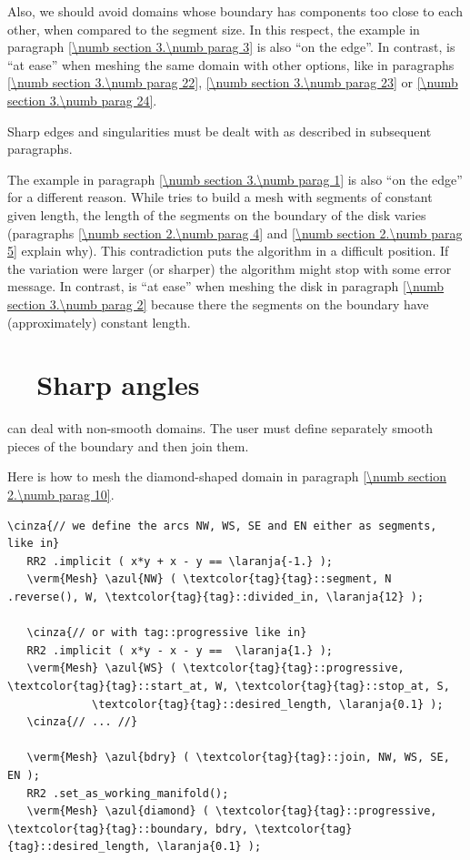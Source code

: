Also, we should avoid domains whose boundary has components too close to each other,
when compared to the segment size.
In this respect, the example in paragraph \ref{\numb section 3.\numb parag 3} is also
``on the edge''.
In contrast, {\maniFEM} is ``at ease'' when meshing the same domain with other options,
like in paragraphs \ref{\numb section 3.\numb parag 22}, \ref{\numb section 3.\numb parag 23}
or \ref{\numb section 3.\numb parag 24}.

Sharp edges and singularities must be dealt with as described in subsequent paragraphs.

The example in paragraph \ref{\numb section 3.\numb parag 1} is also ``on the edge''
for a different reason.
While {\maniFEM} tries to build a mesh with segments of constant given length,
the length of the segments on the boundary of the disk varies (paragraphs
\ref{\numb section 2.\numb parag 4} and \ref{\numb section 2.\numb parag 5} explain why).
This contradiction puts the algorithm in a difficult position.
If the variation were larger (or sharper) the algorithm might stop with some error message.
In contrast, {\maniFEM} is ``at ease'' when meshing the disk in paragraph
\ref{\numb section 3.\numb parag 2} because there the segments on the boundary have
(approximately) constant length.


\section{~~Sharp angles}\label{\numb section 3.\numb parag 17}

{\ManiFEM} can deal with non-smooth domains.
The user must define separately smooth pieces of the boundary and then join them.

Here is how to mesh the diamond-shaped domain in paragraph \ref{\numb section 2.\numb parag 10}.

\begin{Verbatim}[commandchars=\\\{\},formatcom=\small\tt,frame=single,
   label=parag-\ref{\numb section 3.\numb parag 17}.cpp,rulecolor=\color{coment},
   baselinestretch=0.94,framesep=2mm                                            ]
   \cinza{// we define the arcs NW, WS, SE and EN either as segments, like in}
   RR2 .implicit ( x*y + x - y == \laranja{-1.} );
   \verm{Mesh} \azul{NW} ( \textcolor{tag}{tag}::segment, N .reverse(), W, \textcolor{tag}{tag}::divided_in, \laranja{12} );
   
   \cinza{// or with tag::progressive like in}
   RR2 .implicit ( x*y - x - y ==  \laranja{1.} );
   \verm{Mesh} \azul{WS} ( \textcolor{tag}{tag}::progressive, \textcolor{tag}{tag}::start_at, W, \textcolor{tag}{tag}::stop_at, S,
             \textcolor{tag}{tag}::desired_length, \laranja{0.1} );
   \cinza{// ... //}
             
   \verm{Mesh} \azul{bdry} ( \textcolor{tag}{tag}::join, NW, WS, SE, EN );
   RR2 .set_as_working_manifold();
   \verm{Mesh} \azul{diamond} ( \textcolor{tag}{tag}::progressive, \textcolor{tag}{tag}::boundary, bdry, \textcolor{tag}{tag}::desired_length, \laranja{0.1} );
\end{Verbatim}

